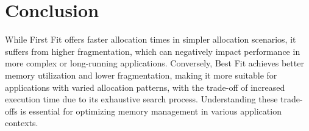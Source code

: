\documentclass[12pt]{article}
\begin{document}
\section{Conclusion}
While First Fit offers faster allocation times in simpler allocation scenarios, it suffers from higher fragmentation, which can negatively impact performance in more complex or long-running applications. Conversely, Best Fit achieves better memory utilization and lower fragmentation, making it more suitable for applications with varied allocation patterns, with the trade-off of increased execution time due to its exhaustive search process. Understanding these trade-offs is essential for optimizing memory management in various application contexts.
\end{document}
